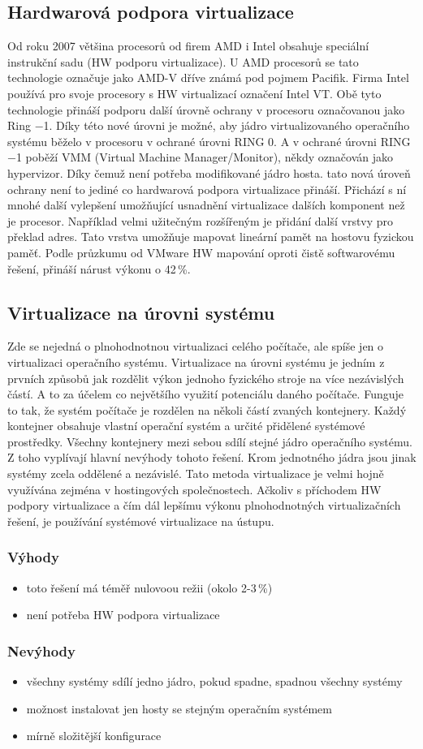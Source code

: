 \subsection{Hardwarová podpora virtualizace}
Od roku 2007 většina procesorů od firem AMD i Intel obsahuje speciální instrukční sadu (HW podporu virtualizace). U AMD procesorů se tato technologie označuje jako AMD-V dříve známá pod pojmem Pacifik. Firma Intel používá pro svoje procesory s HW virtualizací označení Intel VT. Obě tyto technologie přináší podporu další úrovně ochrany v procesoru označovanou jako Ring $-$1. Díky této nové úrovni je možné, aby jádro virtualizovaného operačního systému běželo v procesoru v ochrané úrovni RING 0. A v ochrané úrovni RING $-$1 poběží VMM (Virtual Machine Manager/Monitor), někdy označován jako hypervizor. Díky čemuž není potřeba modifikované jádro hosta. tato nová úroveň ochrany není to jediné co hardwarová podpora virtualizace přináší. Přichází s ní mnohé další vylepšení umožňující usnadnění virtualizace dalších komponent než je procesor. Například velmi užitečným rozšířeným je přidání další vrstvy pro překlad adres. Tato vrstva umožňuje mapovat lineární pamět na hostovu fyzickou paměť. Podle průzkumu od VMware HW mapování oproti čistě softwarovému řešení, přináší nárust výkonu o 42\,\%.

\subsection{Virtualizace na úrovni systému}
Zde se nejedná o plnohodnotnou virtualizaci celého počítače, ale spíše jen o virtualizaci operačního systému. Virtualizace na úrovni systému je jedním z prvních způsobů jak rozdělit výkon jednoho fyzického stroje na více nezávislých částí. A to za účelem co největšího využití potenciálu daného počítače. Funguje to tak, že systém počítače je rozdělen na několi částí zvaných kontejnery. Každý kontejner obsahuje vlastní operační systém a určité přidělené systémové prostředky. Všechny kontejnery mezi sebou sdílí stejné jádro operačního systému. Z toho vyplívají hlavní nevýhody tohoto řešení. Krom jednotného jádra jsou jinak systémy zcela oddělené a nezávislé. Tato metoda virtualizace je velmi hojně využívána zejména v hostingových společnostech. Ačkoliv s příchodem HW podpory virtualizace a čím dál lepšímu výkonu plnohodnotných virtualizačních řešení, je používání systémové virtualizace na ústupu.

\subsubsection*{Výhody}
\begin{itemize}
  \item toto řešení má téměř nulovoou režii (okolo 2-3\,\%)
  \item není potřeba HW podpora virtualizace
\end{itemize}

\subsubsection*{Nevýhody}
\begin{itemize}
  \item všechny systémy sdílí jedno jádro, pokud spadne, spadnou všechny systémy
  \item možnost instalovat jen hosty se stejným operačním systémem
  \item mírně složitější konfigurace
\end{itemize}
